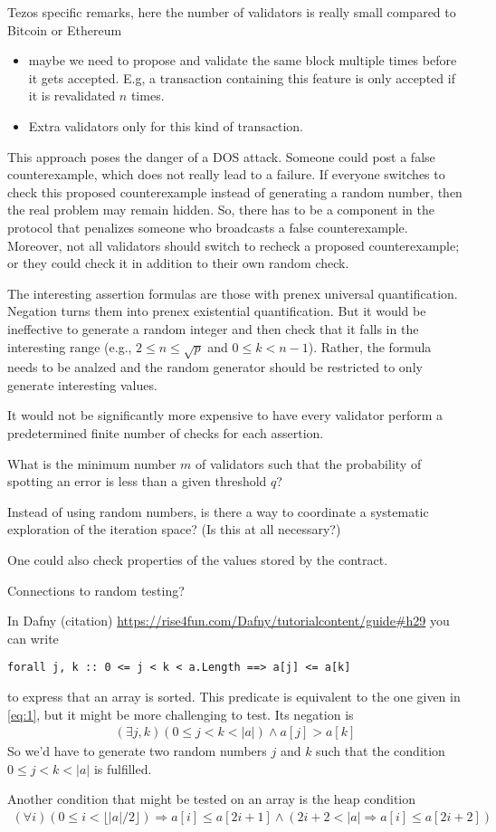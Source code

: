 \documentclass{article}
\newenvironment{changethis}{%
  \begin{tcolorbox}[breakable,notitle,boxrule=0pt,colback=blue!20,colframe=blue!20]}{%
  \end{tcolorbox}}
\begin{document}
\begin{changethis}
  Tezos specific remarks, here the number of validators is really small compared to
  Bitcoin or Ethereum
  \begin{itemize}
  \item maybe we need to propose and validate the same block multiple times before it
    gets accepted. E.g, a transaction containing this feature is only accepted if it is
    revalidated $n$ times.
  \item Extra validators only for this kind of transaction.
  \end{itemize}
\end{changethis}
This approach poses the danger of a DOS attack. Someone could post a false
counterexample, which does not really lead to a failure. If everyone switches to check
this proposed counterexample instead of generating a random number, then the real
problem may remain hidden. So, there has to be a component in the protocol that
penalizes someone who broadcasts a false counterexample. Moreover, not all validators
should switch to recheck a proposed counterexample; or they could check it in addition
to their own random check.

The interesting assertion formulas are those with prenex universal
quantification. Negation turns them into prenex existential quantification. But it
would be ineffective to generate a random integer and then check that it falls in the
interesting range (e.g., $2\le n \le \sqrt p$ and $0\le k< n-1$). Rather, the formula
needs to be analzed and the random generator should be restricted to only generate
interesting values. 

It would not be significantly more expensive to have every validator perform a
predetermined finite number of checks for each assertion.

What is the minimum number $m$ of validators such that the probability of spotting an
error is less than a given threshold $q$?

Instead of using random numbers, is there a way to coordinate a systematic exploration
of the iteration space? (Is this at all necessary?)

One could also check properties of the values stored by the contract.

Connections to random testing?

In Dafny (citation) \url{https://rise4fun.com/Dafny/tutorialcontent/guide#h29} you can
write
\begin{lstlisting}
forall j, k :: 0 <= j < k < a.Length ==> a[j] <= a[k]
\end{lstlisting}
to express that an array is sorted. This predicate is equivalent to the one given in
\eqref{eq:1}, but it might be more challenging to test. Its negation is
\begin{gather}
  \label{eq:2}
  (\exists j, k ) (0\le j< k < |a|) \wedge a[j] > a[k]
\end{gather}
So we'd have to generate two random numbers $j$ and $k$ such that the condition $0 \le
j < k < |a|$ is fulfilled.


Another condition that might be tested on an array is the heap condition
\begin{gather}
  \label{eq:3}
  (\forall i) (0 \le i < \lfloor|a|/2\rfloor) \Rightarrow a[i] \le a[2i+1] \wedge (2i+2
  < |a| \Rightarrow a[i] \le a[2i+2])
\end{gather}
\end{document}
